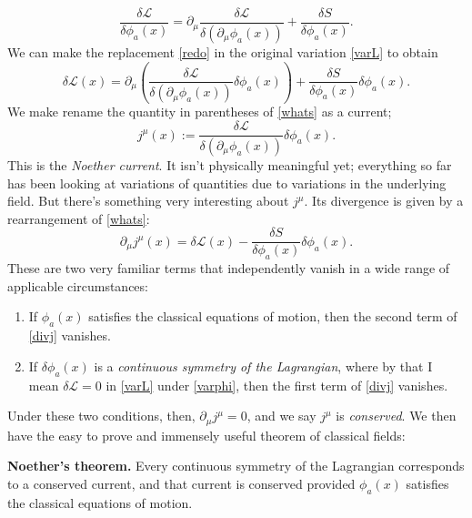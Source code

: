 \documentclass[main.tex]{subfiles}
\begin{document}
\begin{equation} \label{redo}
\frac{\delta \mathcal{L}}{\delta\phi_a (x)} = \partial_\mu \frac{\delta \mathcal{L} }{\delta (\partial_\mu \phi_a (x))} + \frac{\delta S}{\delta \phi_a (x)}.
\end{equation}
We can make the replacement \ref{redo} in the original variation \ref{varL} to obtain
\begin{equation} \label{whats}
\delta \mathcal{L} (x) = \partial_\mu \left(
\frac{\delta \mathcal{L}}{\delta (\partial_\mu \phi_a (x))} \delta \phi_a (x)
\right) + \frac{\delta S}{\delta \phi_a (x)} \delta \phi_a (x).
\end{equation}
We make rename the quantity in parentheses of \ref{whats} as a current;
\begin{equation} \label{noethercurrent}
j^\mu (x) := \frac{\delta \mathcal{L}}{\delta (\partial_\mu \phi_a (x))} \delta \phi_a (x).
\end{equation}
This is the \textit{Noether current}. It isn't physically meaningful yet; everything so far has been looking at variations of quantities due to variations in the underlying field. But there's something very interesting about $j^\mu$. Its divergence is given by a rearrangement of \ref{whats}:
\begin{equation} \label{divj}
\partial_\mu j^\mu (x) = \delta \mathcal{L} (x) - \frac{\delta S}{\delta\phi_a (x)} \delta \phi_a (x).
\end{equation}
These are two very familiar terms that independently vanish in a wide range of applicable circumstances:
\begin{enumerate} [(1)]
\item If $\phi_a (x)$ satisfies the classical equations of motion, then the second term of \ref{divj} vanishes. 

\item If $\delta \phi_a (x)$ is a \textit{continuous symmetry of the Lagrangian}, where by that I mean $\delta \mathcal{L}=0$ in \ref{varL} under \ref{varphi}, then the first term of \ref{divj} vanishes.
\end{enumerate}
Under these two conditions, then, $\partial_\mu j^\mu = 0$, and we say $j^\mu$ is \textit{conserved}. We then have the easy to prove and immensely useful theorem of classical fields:

\begin{thm} \label{thm:noether} \textbf{Noether's theorem.}
Every continuous symmetry of the Lagrangian corresponds to a conserved current, and that current is conserved provided $\phi_a (x)$ satisfies the classical equations of motion.
\end{thm}
\end{document}
